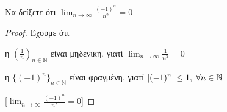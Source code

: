 \documentclass[a4paper,table]{report}
\begin{document}
\begin{example}
  Να δείξετε ότι $ \lim_{n \to \infty} \frac{(-1)^{n}}{n^{2}} = 0 $
  \begin{proof}
    Έχουμε ότι 
    \flushleft\parbox[b]{9.5cm}{\begin{myitemize}
        \item η $ (\frac{1}{n})_{n \in \mathbb{N}} $ είναι μηδενική, γιατί 
          $ \lim_{n \to \infty} \frac{1}{n^{2}} = 0 $ \hfill {}
        \item η $ \{ (-1)^{n} \}_{n \in \mathbb{N}} $ είναι φραγμένη, γιατί
          $ \abs{(-1)^{n}} \leq 1, \; \forall n \in \mathbb{N} $ \hfill {}
    \end{myitemize}}
   [$ \lim_{n \to \infty} \frac{(-1)^{n}}{n^{2}} = 0 $]
  \end{proof}
\end{example}
\end{document}

